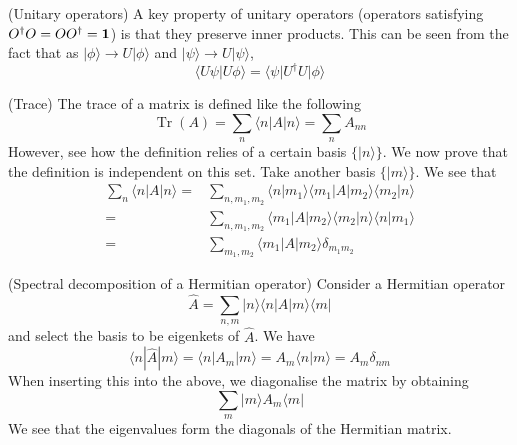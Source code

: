 \vspace{2ex}
\begin{defi}
(Unitary operators) A key property of unitary operators (operators satisfying $O^{\dagger}O=OO^{\dagger}={\bf 1}$) is that they preserve inner products. This can be seen from the fact that as $|\phi \rangle \rightarrow U|\phi \rangle $ and $|\psi \rangle \rightarrow U|\psi \rangle $, 
\[\langle U\psi |U\phi \rangle =\langle \psi |U^{\dagger}U|\phi \rangle \]
\end{defi}
\vspace{2ex}
\begin{defi}
(Trace) The trace of a matrix is defined like the following
\[\mathop{\mathrm{Tr}}(A)=\sum _{n}\langle n|A|n\rangle =\sum _{n}A_{nn}\]
However, see how the definition relies of a certain basis $\{|n\rangle \}$. We now prove that the definition is independent on this set. Take another basis $\{|m\rangle \}$. We see that
\begin{align*}
\sum _{n}\langle n|A|n\rangle =&\sum _{n,m_1,m_2}\langle n|m_1\rangle \langle m_1|A|m_2\rangle \langle m_2|n\rangle \\=&\sum _{n,m_1,m_2}\langle m_1|A|m_2\rangle \langle m_2|n\rangle \langle n|m_1\rangle\\ =&\sum _{m_1,m_2}\langle m_1|A|m_2\rangle \delta _{m_1m_2}
\end{align*}
\end{defi}
\vspace{2ex}
\begin{defi}
(Spectral decomposition of a Hermitian operator) Consider a Hermitian operator 
\[\hat{A}=\sum _{n,m}|n\rangle \langle n|A|m\rangle \langle m|\]
and select the basis to be eigenkets of $\hat{A}$. We have
\[\langle n|\hat{A}|m\rangle =\langle n|A_{m}|m\rangle =A_{m}\langle n|m\rangle =A_{m}\delta _{nm}\]
When inserting this into the above, we diagonalise the matrix by obtaining
\[\sum _{m}|m\rangle A_{m}\langle m|\]
We see that the eigenvalues form the diagonals of the Hermitian matrix. 
\end{defi}
\vspace{2ex}
